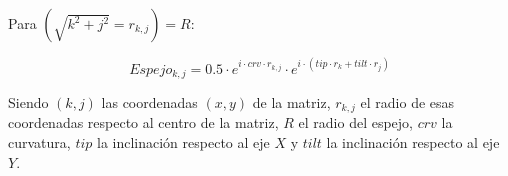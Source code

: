 \documentclass[twoside]{article}
\begin{document}
					Para $(\sqrt{k^2+j^2}=r_{k,j}) = R$:

						\begin{equation}
							Espejo_{k,j} = 0.5 \cdot e^{i\cdot crv \cdot r_{k,j}} \cdot e^{i\cdot (tip\cdot r_k + tilt \cdot r_j)}
							\label{eq:Espejo}
						\end{equation}	

					Siendo $(k, j)$ las coordenadas $(x, y)$ de la matriz, $r_{k, j}$ el radio de esas coordenadas respecto al centro de la matriz, $R$ el radio del espejo, $crv$ la curvatura, $tip$ la inclinación respecto al eje $X$ y $tilt$ la inclinación respecto al eje $Y$.
	    		

	
	
\end{document}
